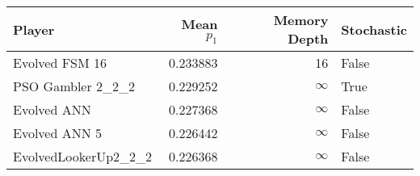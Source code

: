 \begin{tabular}{lrrl}
\toprule
               Player &  Mean $p_1$ &  Memory Depth & Stochastic \\
\midrule
       Evolved FSM 16 &    0.233883 &            16 &      False \\
    PSO Gambler 2\_2\_2 &    0.229252 &            \(\infty\) &       True \\
          Evolved ANN &    0.227368 &            \(\infty\) &      False \\
        Evolved ANN 5 &    0.226442 &            \(\infty\) &      False \\
 EvolvedLookerUp2\_2\_2 &    0.226368 &            \(\infty\) &      False \\
\bottomrule
\end{tabular}
